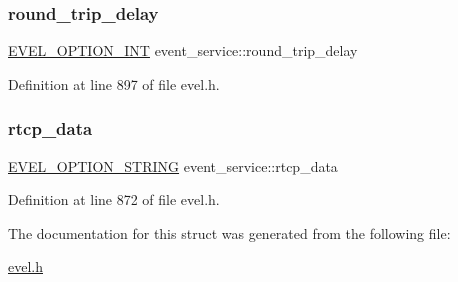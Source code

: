 \subsubsection{\texorpdfstring{round\+\_\+trip\+\_\+delay}{round\_trip\_delay}}
{\footnotesize\ttfamily \hyperlink{evel_8h_a452d825778d1c2368a54b8f689a25ba7}{E\+V\+E\+L\+\_\+\+O\+P\+T\+I\+O\+N\+\_\+\+I\+NT} event\+\_\+service\+::round\+\_\+trip\+\_\+delay}



Definition at line 897 of file evel.\+h.

\hypertarget{structevent__service_a97bdd5bde33a8c772c20f8183d550206}{}\label{structevent__service_a97bdd5bde33a8c772c20f8183d550206} 
\subsubsection{\texorpdfstring{rtcp\+\_\+data}{rtcp\_data}}
{\footnotesize\ttfamily \hyperlink{evel_8h_a0de5113a7b72de93c0c7b644f7ea7ec3}{E\+V\+E\+L\+\_\+\+O\+P\+T\+I\+O\+N\+\_\+\+S\+T\+R\+I\+NG} event\+\_\+service\+::rtcp\+\_\+data}



Definition at line 872 of file evel.\+h.



The documentation for this struct was generated from the following file\+:\begin{DoxyCompactItemize}
\item 
\hyperlink{evel_8h}{evel.\+h}\end{DoxyCompactItemize}
